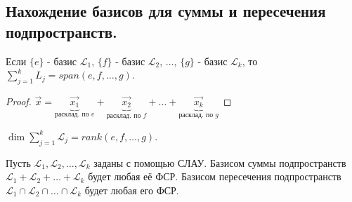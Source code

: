 \subsection{
    Нахождение базисов для суммы и пересечения подпространств.
}

\begin{theorem}
    Если $\{e\}$ - базис $\mathcal{L}_1$, $\{f\}$ - базис $\mathcal{L}_2$, $\ldots$, $\{g\}$ - базис $\mathcal{L}_k$, то $\sum_{j=1}^{k} L_j = span(e, f, \ldots, g)$.
\end{theorem}

\begin{proof}
    $\vec{x} = \underbrace{\vec{x_1}}_{\text{расклад. по $e$}} + \underbrace{\vec{x_2}}_{\text{расклад. по $f$}} + \ldots + \underbrace{\vec{x_k}}_{\text{расклад. по $g$}}$
\end{proof}

\begin{comment}
    Набор $(e, f, \ldots, g)$ может быть избыточен; нужны только ЛНЗ векторы.
\end{comment}

\begin{proposition}
    $\dim \sum_{j=1}^{k} \mathcal{L}_j = rank(e, f, \ldots, g)$.
\end{proposition}

Пусть $\mathcal{L}_1, \mathcal{L}_2, \ldots, \mathcal{L}_k$ заданы с помощью СЛАУ. Базисом суммы подпространств $\mathcal{L}_1 + \mathcal{L}_2 + \ldots + \mathcal{L}_k$ будет любая её ФСР. Базисом пересечения подпространств $\mathcal{L}_1 \cap \mathcal{L}_2 \cap \ldots \cap \mathcal{L}_k$ будет любая его ФСР.

